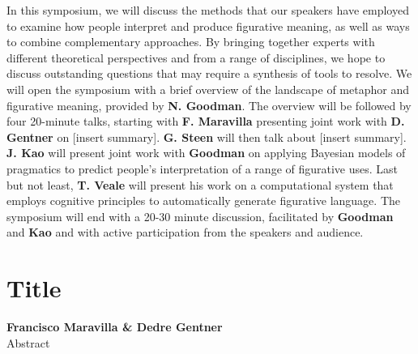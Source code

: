 \documentclass[10pt,letterpaper]{article}
\begin{document}
In this symposium, we will discuss the methods that our speakers have employed to examine how people interpret and produce figurative meaning, as well as ways to combine complementary approaches. By bringing together experts with different theoretical perspectives and from a range of disciplines, we hope to discuss outstanding questions that may require a synthesis of tools to resolve. We will open the symposium with a brief overview of the landscape of metaphor and figurative meaning, provided by \textbf{N. Goodman}. The overview will be followed by four 20-minute talks, starting with \textbf{F. Maravilla} presenting joint work with \textbf{D. Gentner} on [insert summary].
\textbf{G. Steen} will then talk about [insert summary]. \textbf{J. Kao} will present joint work with \textbf{Goodman} on applying Bayesian models of pragmatics to predict people's interpretation of a range of figurative uses. Last but not least, \textbf{T. Veale} will present his work on a computational system that employs cognitive principles to automatically generate figurative language.
The symposium will end with a 20-30 minute discussion, facilitated by \textbf{Goodman} and \textbf{Kao} and with active participation from the speakers and audience.	


\section{Title}
\large \textbf{Francisco Maravilla \& Dedre Gentner}\\
Abstract
\end{document}

